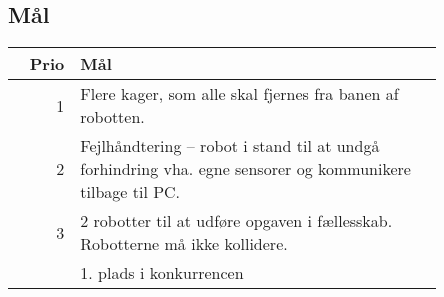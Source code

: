 \subsection{Mål}
\begin{tabular}{r p{0.85\linewidth}}
	\textbf{Prio} & \textbf{Mål} \\
	\hline
	1 & Flere kager, som alle skal fjernes fra banen af robotten.\\
	2 & Fejlhåndtering -- robot i stand til at undgå forhindring vha. egne sensorer og kommunikere tilbage til PC.\\
	3 & 2 robotter til at udføre opgaven i fællesskab. Robotterne må ikke kollidere.\\
	  & 1. plads i konkurrencen
\end{tabular}